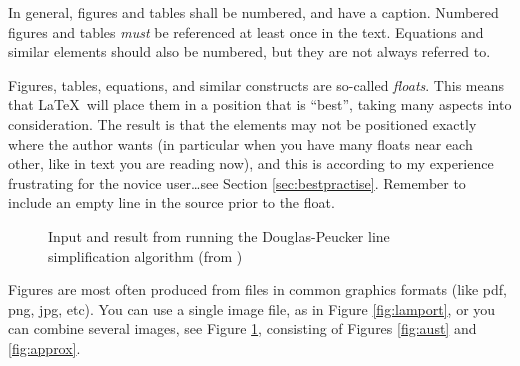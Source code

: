 In general, figures and tables shall be numbered, and have a caption. Numbered figures and tables {\em must} be referenced at least once in the text. Equations and similar elements should also be numbered, but they are not always referred to.

Figures, tables, equations, and similar constructs are so-called {\em floats}. This means that \LaTeX\ will place them in a position that is ``best'', taking many aspects into consideration. The result is that the elements may not be positioned exactly where the author wants (in particular when you have many floats near each other, like in text you are reading now), and this is according to my experience frustrating for the novice user\dots see Section \ref{sec:bestpractise}. Remember to include an empty line in the source prior to the float.

\begin{figure}[!h]
  \begin{center}
  \end{center}
  \caption{Input and result from running the Douglas-Peucker line simplification algorithm (from \cite{kjeldsen05cor})}
  \label{fig:dpaustralia}
\end{figure}

Figures are most often produced from files in common graphics formats (like pdf, png, jpg, etc). You can use a single image file, as in Figure \ref{fig:lamport}, or
you can combine several images, see Figure \ref{fig:dpaustralia}, consisting of Figures \ref{fig:aust} and \ref{fig:approx}.

